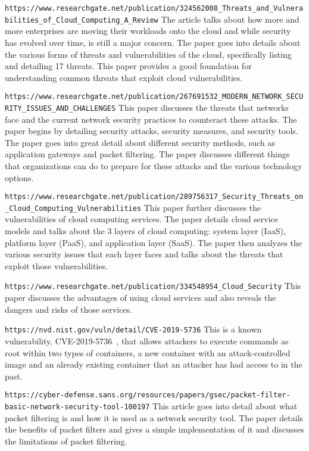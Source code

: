 \verb|https://www.researchgate.net/publication/324562008_Threats_and_Vulnerabilities_of_Cloud_Computing_A_Review|
The article talks about how more and more enterprises are moving their workloads onto the cloud and while
security has evolved over time, is still a major concern. The paper goes into details about the various forms
of threats and vulnerabilities of the cloud, specifically listing and detailing 17 threats. This paper
provides a good foundation for understanding common threats that exploit cloud vulnerabilities.

\verb|https://www.researchgate.net/publication/267691532_MODERN_NETWORK_SECURITY_ISSUES_AND_CHALLENGES|
This paper discusses the threats that networks face and the current network security practices to counteract these attacks.
The paper begins by detailing security attacks, security measures, and security tools. The paper goes into great detail about
different security methods, such as application gateways and packet filtering. The paper discusses different things that organizations
can do to prepare for these attacks and the various technology options.

\verb|https://www.researchgate.net/publication/289756317_Security_Threats_on_Cloud_Computing_Vulnerabilities|
This paper further discusses the vulnerabilities of cloud computing services. The paper details cloud service models and talks about
the 3 layers of cloud computing: system layer (IaaS), platform layer (PaaS), and application layer (SaaS). The paper then analyzes
the various security issues that each layer faces and talks about the threats that exploit those vulnerabilities.

\verb|https://www.researchgate.net/publication/334548954_Cloud_Security|
This paper discusses the advantages of using cloud services and also reveals the dangers and risks of those services.

\verb|https://nvd.nist.gov/vuln/detail/CVE-2019-5736|
This is a known vulnerability, CVE-2019-5736~\cite{cve}, that allows attackers to execute commands as root within two types of containers,
a new container with an attack-controlled image and an already existing container that an attacker has had access to in the past.

\verb|https://cyber-defense.sans.org/resources/papers/gsec/packet-filter-basic-network-security-tool-100197|
This article goes into detail about what packet filtering is and how it is used as a network security tool.
The paper details the benefits of packet filters and gives a simple implementation of it and discusses
the limitations of packet filtering.
